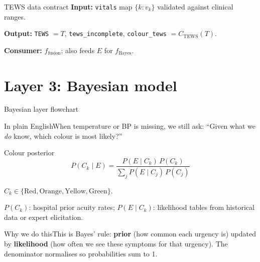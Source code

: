 \documentclass[aspectratio=169,11pt]{beamer}
\newcommand{\why}[1]{\begin{block}{Why we do this}\small #1\end{block}}
\newcommand{\plain}[1]{\begin{block}{In plain English}\small #1\end{block}}
\begin{document}
\begin{frame}{TEWS data contract}
	\textbf{Input:} \texttt{vitals} map $\{k: v_k\}$ validated against clinical ranges.

	\textbf{Output:} \texttt{TEWS} $=T$, \texttt{tews\_incomplete}, \texttt{colour\_tews} $= C_{\text{TEWS}}(T)$.

	\textbf{Consumer:} $f_{\text{fusion}}$; also feeds $E$ for $f_{\text{Bayes}}$.
\end{frame}

\section{Layer 3: Bayesian model}

\begin{frame}{Bayesian layer flowchart}
	\begin{center}
	\end{center}

	\plain{When temperature or BP is missing, we still ask: ``Given what we \textit{do} know, which colour is most likely?''}
\end{frame}

\begin{frame}{Colour posterior}
	\[
	P(C_k \mid E) = \frac{P(E \mid C_k)\, P(C_k)}{\sum_{j} P(E \mid C_j)\, P(C_j)}
	\]

	$C_k \in \{\text{Red}, \text{Orange}, \text{Yellow}, \text{Green}\}$.

	$P(C_k)$: hospital prior acuity rates; $P(E\mid C_k)$: likelihood tables from historical data or expert elicitation.

	\why{This is Bayes' rule: \textbf{prior} (how common each urgency is) updated by \textbf{likelihood} (how often we see these symptoms for that urgency). The denominator normalises so probabilities sum to 1.}
\end{frame}
\end{document}
